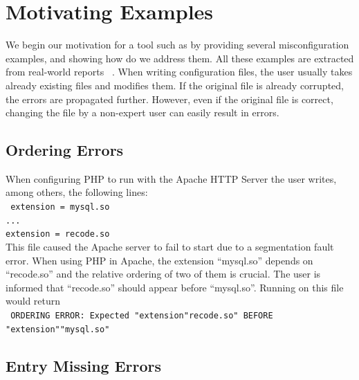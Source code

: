 \section{Motivating Examples}
\label{sec:motiv}

We begin our motivation for a tool such as \app by providing several misconfiguration examples, and showing how do we address them. All these examples are extracted from real-world reports%
~\cite{yin11anempirical, configdataset}. When writing configuration files, the user usually takes already existing files and modifies them. If the original file is already corrupted, the errors are propagated further. However, even if the original file is correct, changing the file by a non-expert user can easily result in errors.


\subsection{Ordering Errors}

When configuring PHP to run with the Apache HTTP Server the user writes, among others, the following lines:\\
 \texttt{
 \hspace*{3em}extension = mysql.so\\
 \hspace*{3em}...\\
 \hspace*{3em}extension = recode.so}\\
This file caused the Apache server to fail to start due to a segmentation fault error.
When using PHP in Apache, the extension ``mysql.so'' depends on ``recode.so'' and the relative ordering of two of them is crucial. 
The user is informed that ``recode.so'' should appear before ``mysql.so''.
 Running \app on this file would return\\
 \texttt{
ORDERING ERROR: Expected "extension"recode.so" BEFORE "extension""mysql.so"
  }\\

\subsection{Entry Missing Errors}

